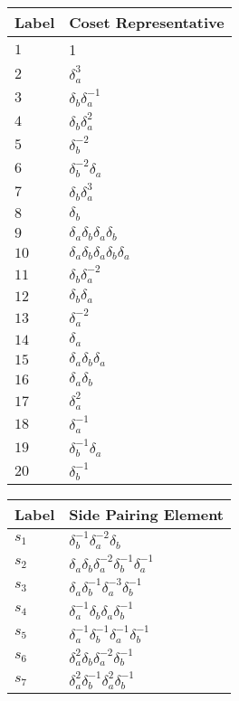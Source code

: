 \documentclass{article}
\begin{document}

\begin{center}
\begin{tabular}{ll}
\toprule
Label & Coset Representative\\
\midrule
$1$ & 1 \\
$2$ & $\delta_a^{3}$ \\
$3$ & $\delta_b^{}\delta_a^{-1}$ \\
$4$ & $\delta_b^{}\delta_a^{2}$ \\
$5$ & $\delta_b^{-2}$ \\
$6$ & $\delta_b^{-2}\delta_a^{}$ \\
$7$ & $\delta_b^{}\delta_a^{3}$ \\
$8$ & $\delta_b^{}$ \\
$9$ & $\delta_a^{}\delta_b^{}\delta_a^{}\delta_b^{}$ \\
$10$ & $\delta_a^{}\delta_b^{}\delta_a^{}\delta_b^{}\delta_a^{}$ \\
$11$ & $\delta_b^{}\delta_a^{-2}$ \\
$12$ & $\delta_b^{}\delta_a^{}$ \\
$13$ & $\delta_a^{-2}$ \\
$14$ & $\delta_a^{}$ \\
$15$ & $\delta_a^{}\delta_b^{}\delta_a^{}$ \\
$16$ & $\delta_a^{}\delta_b^{}$ \\
$17$ & $\delta_a^{2}$ \\
$18$ & $\delta_a^{-1}$ \\
$19$ & $\delta_b^{-1}\delta_a^{}$ \\
$20$ & $\delta_b^{-1}$ \\
\bottomrule
\end{tabular}
\hfill
\begin{tabular}{ll}
\toprule
Label & Side Pairing Element\\
\midrule
$s_{1}$ & $\delta_b^{-1}\delta_a^{-2}\delta_b^{}$ \\
$s_{2}$ & $\delta_a^{}\delta_b^{}\delta_a^{-2}\delta_b^{-1}\delta_a^{-1}$ \\
$s_{3}$ & $\delta_a^{}\delta_b^{-1}\delta_a^{-3}\delta_b^{-1}$ \\
$s_{4}$ & $\delta_a^{-1}\delta_b^{}\delta_a^{}\delta_b^{-1}$ \\
$s_{5}$ & $\delta_a^{-1}\delta_b^{-1}\delta_a^{-1}\delta_b^{-1}$ \\
$s_{6}$ & $\delta_a^{2}\delta_b^{}\delta_a^{-2}\delta_b^{-1}$ \\
$s_{7}$ & $\delta_a^{2}\delta_b^{-1}\delta_a^{2}\delta_b^{-1}$ \\

\end{tabular}
\end{center}
\end{document}
